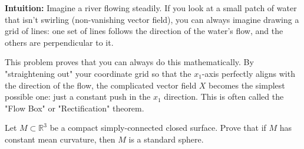 \begin{solution}
\textbf{Intuition:}
Imagine a river flowing steadily. If you look at a small patch of water that isn't swirling (non-vanishing vector field), you can always imagine drawing a grid of lines: one set of lines follows the direction of the water's flow, and the others are perpendicular to it.
\par\vspace{\baselineskip}

This problem proves that you can always do this mathematically. By "straightening out" your coordinate grid so that the $x_1$-axis perfectly aligns with the direction of the flow, the complicated vector field $X$ becomes the simplest possible one: just a constant push in the $x_1$ direction. This is often called the "Flow Box" or "Rectification" theorem.
\end{solution}

\begin{exercise}
\label{geometry:2015:4}
Let $M \subset \mathbb{R}^{3}$ be a compact simply-connected closed surface. Prove that if $M$ has constant mean curvature, then $M$ is a standard sphere.
\end{exercise}

